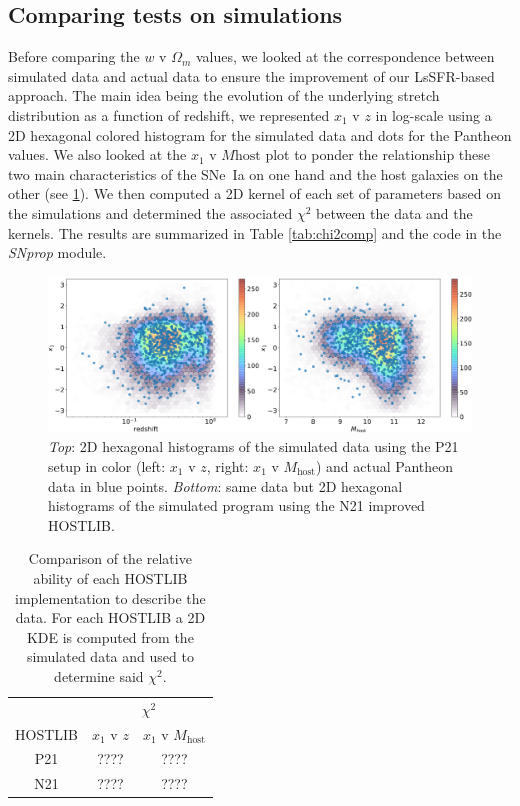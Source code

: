 \documentclass[]{aa}
\begin{document}
\subsection{Comparing tests on simulations}
Before comparing the $w$ v $\Omega_m$ values, we looked at the correspondence
between simulated data and actual data to ensure the improvement of our
LsSFR-based approach. The main idea being the evolution of the underlying stretch
distribution as a function of redshift, we represented $x_1$ v $z$ in log-scale
using a 2D hexagonal colored histogram for the simulated data and dots for the
Pantheon values. We also looked at the $x_1$ v $M\mathrm{host}$ plot to ponder
the relationship these two main characteristics of the SNe~Ia on one hand and the
host galaxies on the other (see \ref{fig:P21vN21}). We then computed a 2D kernel
of each set of parameters based on the simulations and determined the associated
$\chi^2$ between the data and the kernels. The results are summarized in Table
\ref{tab:chi2comp} and the code in the \textit{SNprop} module.

\begin{figure}
    \centering
    \includegraphics[width=\linewidth]{kernel-compare.png}
    \caption{\textit{Top}: 2D hexagonal histograms of the simulated data using
    the P21 setup in color (left: $x_1$ v $z$, right: $x_1$ v $M_\mathrm{host}$)
    and actual Pantheon data in blue points. \textit{Bottom}: same data but
    2D hexagonal histograms of the simulated program using the N21 improved
    HOSTLIB.}
    \label{fig:P21vN21}
\end{figure}

\begin{table}
    \centering
    \caption{Comparison of the relative ability of each HOSTLIB implementation
    to describe the data. For each HOSTLIB a 2D KDE is computed from the simulated
    data and used to determine said $\chi^2$.}
    \label{tab:comp}
    \begin{tabular}{c|cc}
        \hline\hline
                & \multicolumn{2}{c}{$\chi^2$}
        \\
        HOSTLIB & $x_1$ v $z$ & $x_1$ v $M_\mathrm{host}$
        \\\hline
        P21     & ????        & ????
        \\
        N21     & ????        & ????
        \\
        \hline
    \end{tabular}
\end{table}
\end{document}
